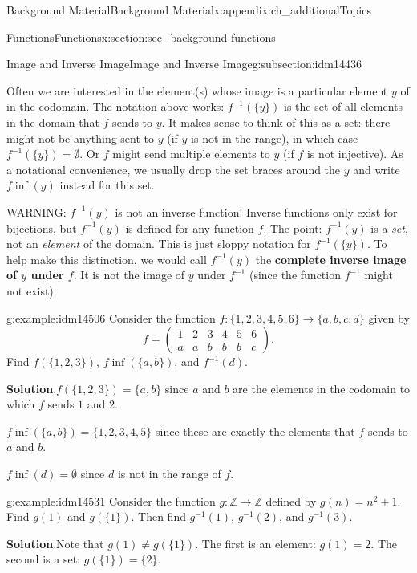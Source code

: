 \documentclass[oneside,10pt,]{book}
\newcommand{\terminology}[1]{\textbf{#1}}
\numberwithin{equation}{chapter}
\def\Z{\mathbb Z}
\def\inv{^{-1}}
\newcommand{\amp}{&}
\begin{document}
\begin{appendixptx}{Background Material}{}{Background Material}{}{}{x:appendix:ch_additionalTopics}
\begin{sectionptx}{Functions}{}{Functions}{}{}{x:section:sec_background-functions}
\begin{subsectionptx}{Image and Inverse Image}{}{Image and Inverse Image}{}{}{g:subsection:idm14436}
\par
Often we are interested in the element(s) whose image is a particular element \(y\) of in the codomain.  The notation above works: \(f\inv(\{y\})\) is the set of all elements in the domain that \(f\) sends to \(y\).  It makes sense to think of this as a set: there might not be anything sent to \(y\) (if \(y\) is not in the range), in which case \(f\inv(\{y\}) = \emptyset\).  Or \(f\) might send multiple elements to \(y\) (if \(f\) is not injective).  As a notational convenience, we usually drop the set braces around the \(y\) and write \(f\inf(y)\) instead for this set.%
\par
WARNING: \(f\inv(y)\) is not an inverse function! Inverse functions only exist for bijections, but \(f\inv(y)\) is defined for any function \(f\). The point: \(f\inv(y)\) is a \emph{set}, not an \emph{element} of the domain.  This is just sloppy notation for \(f\inv(\{y\})\).  To help make this distinction, we would call \(f\inv(y)\) the \terminology{complete inverse image of \(y\) under \(f\)}.  It is not the image of \(y\) under \(f\inv\) (since the function \(f\inv\) might not exist).%
\begin{example}{}{g:example:idm14506}%
Consider the function \(f:\{1,2,3,4,5,6\} \to \{a,b,c,d\}\) given by%
\begin{equation*}
f = \begin{pmatrix}1 \amp 2 \amp 3 \amp 4 \amp 5 \amp 6 \\ a \amp a \amp b \amp b \amp b \amp c\end{pmatrix}.
\end{equation*}
Find \(f(\{1,2,3\})\),  \(f\inf(\{a,b\})\), and \(f\inv(d)\).%
\par\smallskip%
\noindent\textbf{Solution}.\hypertarget{g:solution:idm14514}{}\quad{}\(f(\{1,2,3\}) = \{a,b\}\) since \(a\) and \(b\) are the elements in the codomain to which \(f\) sends \(1\) and \(2\).%
\par
\(f\inf(\{a,b\}) = \{1,2,3,4,5\}\) since these are exactly the elements that \(f\) sends to \(a\) and \(b\).%
\par
\(f\inf(d) = \emptyset\) since \(d\) is not in the range of \(f\).%
\end{example}
\begin{example}{}{g:example:idm14531}%
Consider the function \(g:\Z \to \Z\) defined by \(g(n) = n^2 + 1\). Find \(g(1)\) and \(g(\{1\})\).  Then find \(g\inv(1)\), \(g\inv(2)\), and \(g\inv(3)\).%
\par\smallskip%
\noindent\textbf{Solution}.\hypertarget{g:solution:idm14541}{}\quad{}Note that \(g(1) \ne g(\{1\})\).  The first is an element: \(g(1) = 2\).  The second is a set: \(g(\{1\}) = \{2\}\).%

\end{example}
\end{subsectionptx}
\end{sectionptx}
\end{appendixptx}
\end{document}
